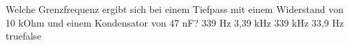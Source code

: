     {Welche Grenzfrequenz ergibt sich bei einem Tiefpass mit einem Widerstand von 10 kOhm und einem Kondensator von 47 nF?}
    {339 Hz}
    {3,39 kHz}
    {339 kHz}
    {33,9 Hz}
    {true}{false}